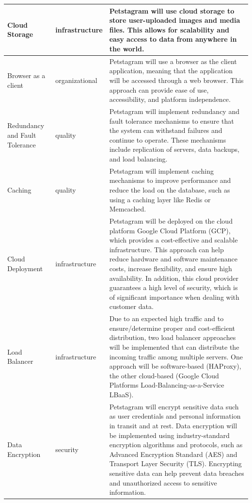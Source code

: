 \documentclass[lettersize,journal]{IEEEtran}
\begin{document}
\begin{table}[htpb]
\begin{tabular}{ |m{3cm}|m{2cm}|m{11cm}| }
        \hline
        Cloud Storage&infrastructure&Petstagram will use cloud storage to store user-uploaded images and media files. This allows for scalability and easy access to data from anywhere in the world.\\
        \hline
        Browser as a client&organizational&Petstagram will use a browser as the client application, meaning that the application will be accessed through a web browser. This approach can provide ease of use, accessibility, and platform independence.\\
        \hline
        Redundancy and Fault Tolerance&quality&Petstagram will implement redundancy and fault tolerance mechanisms to ensure that the system can withstand failures and continue to operate. These mechanisms include replication of servers, data backups, and load balancing.\\
        \hline
        Caching&quality&Petstagram will implement caching mechanisms to improve performance and reduce the load on the database, such as using a caching layer like Redis or Memcached.\\
        \hline
        Cloud Deployment&infrastructure&Petstagram will be deployed on the cloud platform Google Cloud Platform (GCP), which provides a cost-effective and scalable infrastructure. This approach can help reduce hardware and software maintenance costs, increase flexibility, and ensure high availability. In addition, this cloud provider guarantees a high level of security, which is of significant importance when dealing with customer data.\\
        \hline
        Load Balancer&infrastructure&Due to an expected high traffic and to ensure/determine proper and cost-efficient distribution, two load balancer approaches will be implemented that can distribute the incoming traffic among multiple servers. One approach will be software-based (HAProxy), the other cloud-based (Google Cloud Platforms Load-Balancing-as-a-Service LBaaS).\\
        \hline
        Data Encryption&security&Petstagram will encrypt sensitive data such as user credentials and personal information in transit and at rest. Data encryption will be implemented using industry-standard encryption algorithms and protocols, such as Advanced Encryption Standard (AES) and Transport Layer Security (TLS). Encrypting sensitive data can help prevent data breaches and unauthorized access to sensitive information.\\
        \hline

    \end{tabular}
    \\
\end{table}
\end{document}
